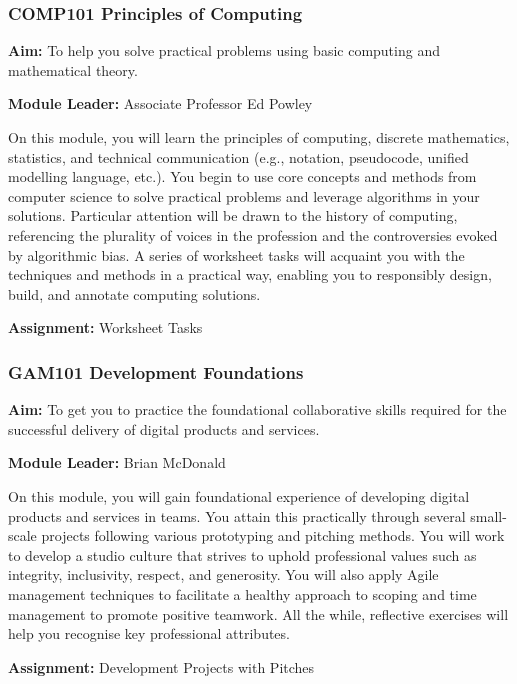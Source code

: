 \begin{frame}
	\frametitle{COMP101 Principles of Computing}
		
	\small{\textbf{Aim:} To help you solve practical problems using basic computing and mathematical theory.}
		\vspace{0.5em}
	
	\small{\textbf{Module Leader:} Associate Professor Ed Powley}	
	
		\vspace{0.5em}
	
\footnotesize{On this module, you will learn the principles of computing, discrete mathematics, statistics, and technical communication (e.g., notation, pseudocode, unified modelling language, etc.). You begin to use core concepts and methods from computer science to solve practical problems and leverage algorithms in your solutions. Particular attention will be drawn to the history of computing, referencing the plurality of voices in the profession and the controversies evoked by algorithmic bias. A series of worksheet tasks will acquaint you with the techniques and methods in a practical way, enabling you to responsibly design, build, and annotate computing solutions.}
		\vspace{0.5em}
	
	\small{\textbf{Assignment:} Worksheet Tasks}	
\end{frame}

\begin{frame}
	\frametitle{GAM101 Development Foundations}
		
	\small{\textbf{Aim:} To get you to practice the foundational collaborative skills required for the successful delivery of digital products and services.}
	
	\vspace{0.5em}
	
	\small{\textbf{Module Leader:} Brian McDonald}
	
	\vspace{0.5em}
	
\footnotesize{On this module, you will gain foundational experience of developing digital products and services in teams. You attain this practically through several small-scale projects following various prototyping and pitching methods. You will work to develop a studio culture that strives to uphold professional values such as integrity, inclusivity, respect, and generosity. You will also apply Agile management techniques to facilitate a healthy approach to scoping and time management to promote positive teamwork. All the while, reflective exercises will help you recognise key professional attributes.}

			\vspace{0.5em}
	
	\small{\textbf{Assignment:} Development Projects with Pitches}	
\end{frame}

